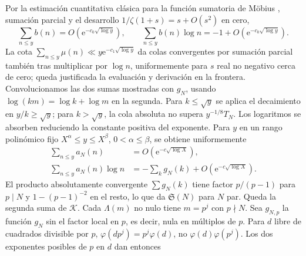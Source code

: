 \documentclass[11pt,a4paper]{article}
\newcommand{\B}[2]{#2}
\newcommand{\B}[2]{#1}
\newcommand{\e}{\mathrm e}
\newcommand{\Sg}{\mathfrak S}
\begin{document}
\B{From the classical quantitative Mertens estimate \cite[Ch.~6]{mv}, partial summation and the expansion $1/\zeta(1+s)=s+O(s^2)$ at zero,}{Por la estimación cuantitativa clásica para la función sumatoria de Möbius \cite[cap.~6]{mv}, sumación parcial y el desarrollo $1/\zeta(1+s)=s+O(s^2)$ en cero,}
\[
 \sum_{n\le y} b(n)=O(\e^{-c_0\sqrt{\log y}}),\qquad
 \sum_{n\le y} b(n)\log n=-1+O(\e^{-c_0\sqrt{\log y}}).
\]
\B{The summatory estimate $\sum_{n\le y}\mu(n)\ll y\e^{-c_1\sqrt{\log y}}$ gives convergent partial-summation tails also after multiplying by $\log n$, uniformly for real $s\ge0$ near zero; this justifies evaluation and differentiation at the boundary. Convolve the last two displayed sums with $g_N$, using $\log(km)=\log k+\log m$ in the second. For $k\le\sqrt{y}$ insert the decay bound at $y/k\ge\sqrt y$; for $k>\sqrt y$, the absolute tail is at most $y^{-1/8}T_N$. Logarithmic factors are absorbed by reducing the positive exponent constant. For $y$ in a fixed polynomial range $X^\alpha\le y\le X^\beta$, $0<\alpha\le\beta$, this gives uniformly}{La cota $\sum_{n\le y}\mu(n)\ll y\e^{-c_1\sqrt{\log y}}$ da colas convergentes por sumación parcial también tras multiplicar por $\log n$, uniformemente para $s$ real no negativo cerca de cero; queda justificada la evaluación y derivación en la frontera. Convolucionamos las dos sumas mostradas con $g_N$, usando $\log(km)=\log k+\log m$ en la segunda. Para $k\le\sqrt{y}$ se aplica el decaimiento en $y/k\ge\sqrt y$; para $k>\sqrt y$, la cola absoluta no supera $y^{-1/8}T_N$. Los logaritmos se absorben reduciendo la constante positiva del exponente. Para $y$ en un rango polinómico fijo $X^\alpha\le y\le X^\beta$, $0<\alpha\le\beta$, se obtiene uniformemente}
\begin{align*}
 \sum_{n\le y}a_N(n)&=O(\e^{-c\sqrt{\log X}}),\\
 \sum_{n\le y}a_N(n)\log n&=-\sum_k g_N(k)+O(\e^{-c\sqrt{\log X}}).
\end{align*}
\B{The absolutely convergent product $\sum g_N(k)$ has factor $p/(p-1)$ at $p\mid N$ and $1-(p-1)^{-2}$ elsewhere, giving $\Sg(N)$ for even $N$. It remains to treat the second sum in $\mathcal K$. Each nonzero $\Lambda(m)$ has $m=p^j$ with $p\nmid N$. Let $g_{N,p}$ be $g_N$ with the $p$-factor removed, i.e., it vanishes on multiples of $p$. For squarefree $d$ divisible by $p$, $\varphi(dp^j)=p^j\varphi(d)$, not $\varphi(d)\varphi(p^j)$. The two squarefree exponents of $p$ in $d$ then give the identity}{El producto absolutamente convergente $\sum g_N(k)$ tiene factor $p/(p-1)$ para $p\mid N$ y $1-(p-1)^{-2}$ en el resto, lo que da $\Sg(N)$ para $N$ par. Queda la segunda suma de $\mathcal K$. Cada $\Lambda(m)$ no nulo tiene $m=p^j$ con $p\nmid N$. Sea $g_{N,p}$ la función $g_N$ sin el factor local en $p$, es decir, nula en múltiplos de $p$. Para $d$ libre de cuadrados divisible por $p$, $\varphi(dp^j)=p^j\varphi(d)$, no $\varphi(d)\varphi(p^j)$. Los dos exponentes posibles de $p$ en $d$ dan entonces}
\end{document}
